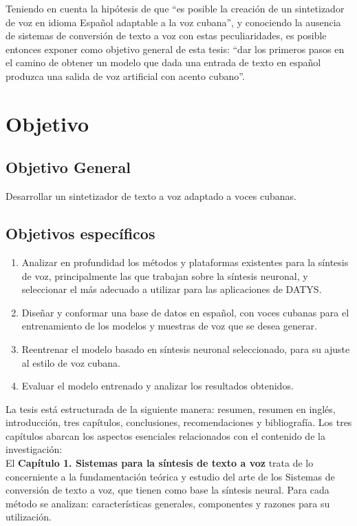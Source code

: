 Teniendo en cuenta la hipótesis de que “es posible la creación de un sintetizador de voz en idioma Español adaptable a la voz cubana”, y conociendo la ausencia de sistemas de conversión de texto a voz con estas peculiaridades, es posible entonces exponer como objetivo general de esta tesis: ``dar los primeros pasos en el camino de obtener un modelo que dada una entrada de texto en español produzca una salida de voz artificial con acento cubano''.

\section*{Objetivo}

\subsection*{Objetivo General}

Desarrollar un sintetizador de texto a voz adaptado a voces cubanas.

\subsection*{Objetivos específicos}
\begin{enumerate}
	\item Analizar en profundidad los métodos y plataformas existentes para la síntesis de voz, principalmente las que trabajan sobre la síntesis neuronal, y seleccionar el más adecuado a utilizar para las aplicaciones de DATYS.
	\item Diseñar y conformar una base de datos en español, con voces cubanas para el entrenamiento de los modelos y muestras de voz que se desea generar.
	\item Reentrenar el modelo basado en síntesis neuronal seleccionado, para su ajuste al estilo de voz cubana.
	\item Evaluar el modelo entrenado y analizar los resultados obtenidos.
\end{enumerate}

La tesis está estructurada de la siguiente manera: resumen, resumen en inglés, introducción, tres capítulos, conclusiones, recomendaciones y bibliografía. Los tres capítulos abarcan los aspectos esenciales relacionados con el contenido de la investigación:\\

El \textbf{Capítulo 1. Sistemas para la síntesis de texto a voz} trata de lo concerniente a la fundamentación teórica y estudio del arte de los Sistemas de conversión de texto a voz, que tienen como base la síntesis neural. Para cada método se analizan: características generales, componentes y razones para su
utilización. \\

